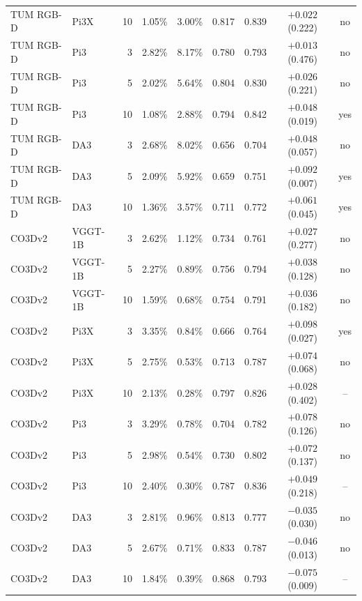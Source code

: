 \begin{tabular}{llrcccccc}
TUM RGB-D & Pi3X & 10 & 1.05\% & 3.00\% & 0.817 & 0.839 & $+0.022$ (0.222) & no \\
TUM RGB-D & Pi3 & 3 & 2.82\% & 8.17\% & 0.780 & 0.793 & $+0.013$ (0.476) & no \\
TUM RGB-D & Pi3 & 5 & 2.02\% & 5.64\% & 0.804 & 0.830 & $+0.026$ (0.221) & no \\
TUM RGB-D & Pi3 & 10 & 1.08\% & 2.88\% & 0.794 & 0.842 & $+0.048$ (0.019) & yes \\
TUM RGB-D & DA3 & 3 & 2.68\% & 8.02\% & 0.656 & 0.704 & $+0.048$ (0.057) & no \\
TUM RGB-D & DA3 & 5 & 2.09\% & 5.92\% & 0.659 & 0.751 & $+0.092$ (0.007) & yes \\
TUM RGB-D & DA3 & 10 & 1.36\% & 3.57\% & 0.711 & 0.772 & $+0.061$ (0.045) & yes \\
\midrule
CO3Dv2 & VGGT-1B & 3 & 2.62\% & 1.12\% & 0.734 & 0.761 & $+0.027$ (0.277) & no \\
CO3Dv2 & VGGT-1B & 5 & 2.27\% & 0.89\% & 0.756 & 0.794 & $+0.038$ (0.128) & no \\
CO3Dv2 & VGGT-1B & 10 & 1.59\% & 0.68\% & 0.754 & 0.791 & $+0.036$ (0.182) & no \\
CO3Dv2 & Pi3X & 3 & 3.35\% & 0.84\% & 0.666 & 0.764 & $+0.098$ (0.027) & yes \\
CO3Dv2 & Pi3X & 5 & 2.75\% & 0.53\% & 0.713 & 0.787 & $+0.074$ (0.068) & no \\
CO3Dv2 & Pi3X & 10 & 2.13\% & 0.28\% & 0.797 & 0.826 & $+0.028$ (0.402) & -- \\
CO3Dv2 & Pi3 & 3 & 3.29\% & 0.78\% & 0.704 & 0.782 & $+0.078$ (0.126) & no \\
CO3Dv2 & Pi3 & 5 & 2.98\% & 0.54\% & 0.730 & 0.802 & $+0.072$ (0.137) & no \\
CO3Dv2 & Pi3 & 10 & 2.40\% & 0.30\% & 0.787 & 0.836 & $+0.049$ (0.218) & -- \\
CO3Dv2 & DA3 & 3 & 2.81\% & 0.96\% & 0.813 & 0.777 & $-0.035$ (0.030) & no \\
CO3Dv2 & DA3 & 5 & 2.67\% & 0.71\% & 0.833 & 0.787 & $-0.046$ (0.013) & no \\
CO3Dv2 & DA3 & 10 & 1.84\% & 0.39\% & 0.868 & 0.793 & $-0.075$ (0.009) & -- \\
\bottomrule
\end{tabular}
